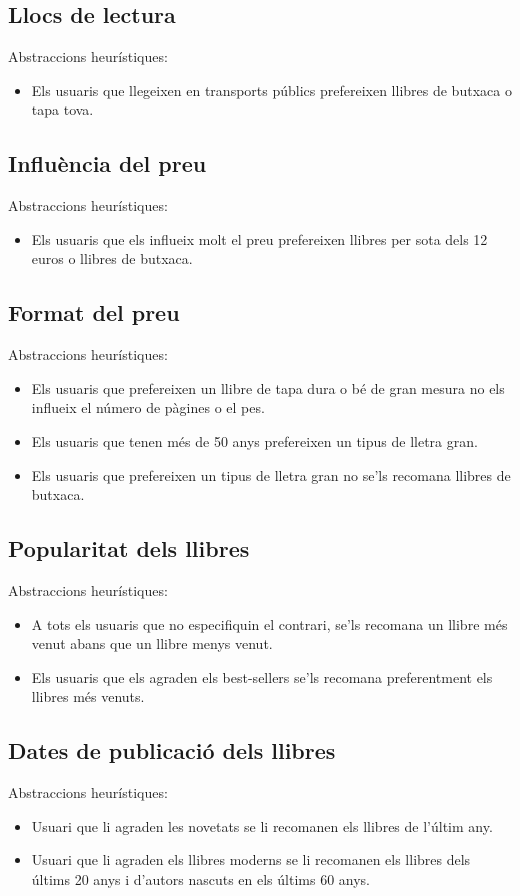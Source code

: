 \subsection{Llocs de lectura}
Abstraccions heurístiques:
\begin{itemize}
  \item Els usuaris que llegeixen en transports públics prefereixen llibres de butxaca o tapa tova.
\end{itemize}

\subsection{Influència del preu}
Abstraccions heurístiques:
\begin{itemize}
  \item Els usuaris que els influeix molt el preu prefereixen llibres per sota dels 12 euros o llibres de butxaca.
\end{itemize}

\subsection{Format del preu}
Abstraccions heurístiques:
\begin{itemize}
  \item Els usuaris que prefereixen un llibre de tapa dura o bé de gran mesura no els influeix el número de pàgines o el pes.
  \item Els usuaris que tenen més de 50 anys prefereixen un tipus de lletra gran.
  \item Els usuaris que prefereixen un tipus de lletra gran no se'ls recomana llibres de butxaca.
\end{itemize}

\subsection{Popularitat dels llibres}
Abstraccions heurístiques:
\begin{itemize}
  \item A tots els usuaris que no especifiquin el contrari, se'ls recomana un llibre més venut abans que un llibre menys venut.
  \item Els usuaris que els agraden els best-sellers se'ls recomana preferentment els llibres més venuts.
\end{itemize}

\subsection{Dates de publicació dels llibres}
Abstraccions heurístiques:
\begin{itemize}
  \item Usuari que li agraden les novetats se li recomanen els llibres de l'últim any.
  \item Usuari que li agraden els llibres moderns se li recomanen els llibres dels  últims 20 anys i d'autors nascuts en els últims 60 anys.
\end{itemize}

